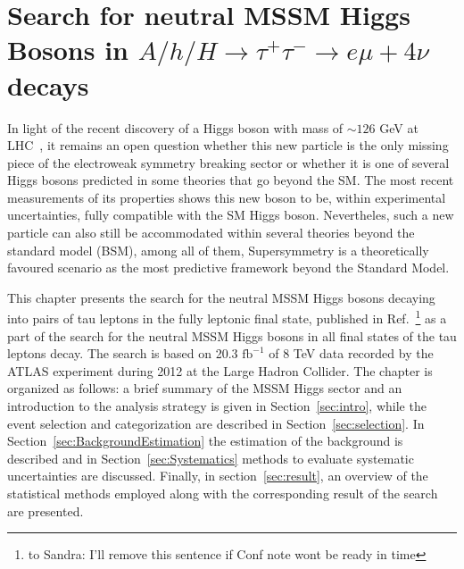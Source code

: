 \chapter[Neutral MSSM Higgs Bosons Search...]{Search for neutral MSSM Higgs Bosons in  
$A/h/H \rightarrow \tau^{+}\tau^{-} \rightarrow e \mu + 4\nu$ decays} \label{chap:anal}



 \vspace{0.5cm}

%
%
In light of the recent discovery of a Higgs 
boson with mass of $\sim 126$ GeV at LHC~\cite{AHiggsO,CHiggsO}, it remains an open question
whether this new particle is the only missing piece of the electroweak symmetry breaking
sector or whether it is one of several Higgs bosons predicted in some theories 
that go beyond the SM. The most recent measurements \cite{ASpin0,ACouplings,CFermions,CWidth} of its
properties shows this new boson to be, within experimental uncertainties, fully
compatible with the SM Higgs boson. Nevertheles, such a new particle can also still
be accommodated within several theories beyond the 
standard model (BSM), among all of them, Supersymmetry  is a theoretically favoured scenario
as the most predictive framework beyond the Standard Model.

This chapter presents the search for the neutral MSSM Higgs bosons decaying into pairs of tau leptons
in the fully leptonic final state, published in Ref.~\cite{}\footnote{to Sandra: I'll remove this sentence
if Conf note wont be ready in time} as a part of the search for the neutral
MSSM Higgs bosons in all final states of the tau leptons decay. 
The search is based on 20.3 $\text{fb}^{-1}$ of 8 TeV data 
recorded by the ATLAS experiment during 2012 at the Large Hadron Collider.
The chapter is organized as follows: a brief summary of the MSSM Higgs sector 
and an introduction to the analysis strategy is given in Section~\ref{sec:intro},
while the event selection and categorization are described in Section~\ref{sec:selection}. 
In Section~\ref{sec:BackgroundEstimation} the estimation of the background is described and
in Section~\ref{sec:Systematics} methods to evaluate systematic uncertainties are discussed. Finally, 
in section~\ref{sec:result}, an overview of the statistical methods employed along with the corresponding
result of the search are presented.

